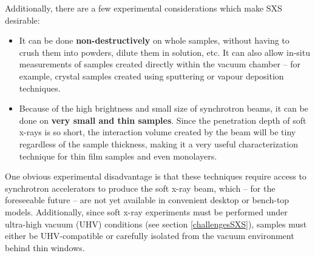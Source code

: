Additionally, there are a few experimental considerations which make SXS desirable:
\begin{itemize}
\item It can be done \textbf{non-destructively} on whole samples, without having to crush them into powders, dilute them in solution, etc.  It can also allow in-situ measurements of samples created directly within the vacuum chamber -- for example, crystal samples created using sputtering or vapour deposition techniques.
\item Because of the high brightness and small size of synchrotron beams, it can be done on \textbf{very small and thin samples}.  Since the penetration depth of soft x-rays is so short, the interaction volume created by the beam will be tiny regardless of the sample thickness, making it a very useful characterization technique for thin film samples and even monolayers.
\end{itemize}
One obvious experimental disadvantage is that these techniques require access to synchrotron accelerators to produce the soft x-ray beam, which -- for the foreseeable future -- are not yet available in convenient desktop or bench-top models.  Additionally, since soft x-ray experiments must be performed under ultra-high vacuum (UHV) conditions (see section \ref{challengesSXS}), samples must either be UHV-compatible or carefully isolated from the vacuum environment behind thin windows.

